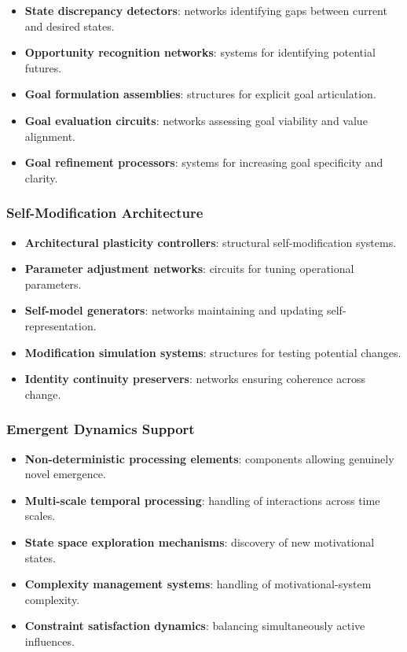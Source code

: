 \documentclass[12pt]{article}
\begin{document}
\begin{itemize}
\item \textbf{State discrepancy detectors}: networks identifying gaps between current and desired states.
\item \textbf{Opportunity recognition networks}: systems for identifying potential futures.
\item \textbf{Goal formulation assemblies}: structures for explicit goal articulation.
\item \textbf{Goal evaluation circuits}: networks assessing goal viability and value alignment.
\item \textbf{Goal refinement processors}: systems for increasing goal specificity and clarity.
\end{itemize}

\subsubsection{Self-Modification Architecture}

\begin{itemize}
\item \textbf{Architectural plasticity controllers}: structural self-modification systems.
\item \textbf{Parameter adjustment networks}: circuits for tuning operational parameters.
\item \textbf{Self-model generators}: networks maintaining and updating self-representation.
\item \textbf{Modification simulation systems}: structures for testing potential changes.
\item \textbf{Identity continuity preservers}: networks ensuring coherence across change.
\end{itemize}

\subsubsection{Emergent Dynamics Support}

\begin{itemize}
\item \textbf{Non-deterministic processing elements}: components allowing genuinely novel emergence.
\item \textbf{Multi-scale temporal processing}: handling of interactions across time scales.
\item \textbf{State space exploration mechanisms}: discovery of new motivational states.
\item \textbf{Complexity management systems}: handling of motivational-system complexity.
\item \textbf{Constraint satisfaction dynamics}: balancing simultaneously active influences.
\end{itemize}
\end{document}
